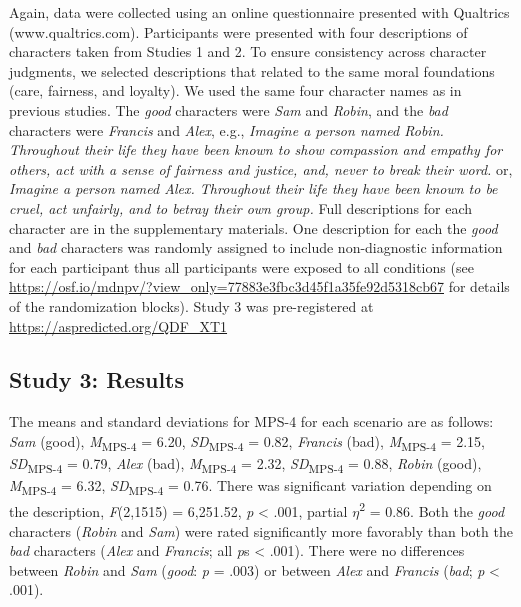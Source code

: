 \documentclass[
  man,floatsintext]{apa7}
\begin{document}
Again, data were collected using an online questionnaire presented with Qualtrics (www.qualtrics.com). Participants were presented with four descriptions of characters taken from Studies 1 and 2. To ensure consistency across character judgments, we selected descriptions that related to the same moral foundations (care, fairness, and loyalty). We used the same four character names as in previous studies. The \emph{good} characters were \emph{Sam} and \emph{Robin}, and the \emph{bad} characters were \emph{Francis} and \emph{Alex}, e.g., \emph{Imagine a person named Robin. Throughout their life they have been known to show compassion and empathy for others, act with a sense of fairness and justice, and, never to break their word.} or, \emph{Imagine a person named Alex. Throughout their life they have been known to be cruel, act unfairly, and to betray their own group.} Full descriptions for each character are in the supplementary materials. One description for each the \emph{good} and \emph{bad} characters was randomly assigned to include non-diagnostic information for each participant thus all participants were exposed to all conditions (see \color{blue}\url{https://osf.io/mdnpv/?view_only=77883e3fbc3d45f1a35fe92d5318cb67}\color{black} for details of the randomization blocks). Study 3 was pre-registered at \color{blue}\url{https://aspredicted.org/QDF_XT1}\color{black}

\subsection{Study 3: Results}\label{study-3-results}

The means and standard deviations for MPS-4 for each scenario are as follows:
\emph{Sam} (good),
\emph{M}\textsubscript{MPS-4} = 6.20, \emph{SD}\textsubscript{MPS-4} = 0.82,
\emph{Francis} (bad),
\emph{M}\textsubscript{MPS-4} = 2.15, \emph{SD}\textsubscript{MPS-4} = 0.79,
\emph{Alex} (bad),
\emph{M}\textsubscript{MPS-4} = 2.32, \emph{SD}\textsubscript{MPS-4} = 0.88,
\emph{Robin} (good),
\emph{M}\textsubscript{MPS-4} = 6.32, \emph{SD}\textsubscript{MPS-4} = 0.76. There was significant variation depending on the description, \emph{F}(2,1515) = 6,251.52, \emph{p} \textless{} .001, partial \(\eta\)\textsuperscript{2} = 0.86. Both the \emph{good} characters (\emph{Robin} and \emph{Sam}) were rated significantly more favorably than both the \emph{bad} characters (\emph{Alex} and \emph{Francis}; all \emph{p}s \textless{} .001). There were no differences between \emph{Robin} and \emph{Sam} (\emph{good}: \emph{p} = .003) or between \emph{Alex} and \emph{Francis} (\emph{bad}; \emph{p} \textless{} .001).
\end{document}
